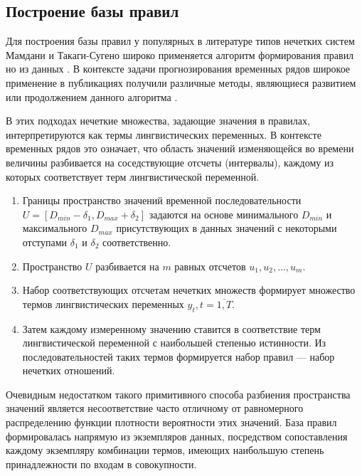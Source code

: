 \subsection{Построение базы правил}

Для построения базы правил у популярных в литературе типов нечетких систем Мамдани и Такаги-Сугено широко применяется алгоритм формирования правил но из данных \cite{Wang1992}. В контексте задачи прогнозирования временных рядов широкое применение в публикациях получили различные методы, являющиеся развитием или продолжением данного алгоритма \cite{Chellai2022}.

В этих подходах нечеткие множества, задающие значения в правилах, интерпретируются как термы лингвистических переменных. В контексте временных рядов это означает, что область значений изменяющейся во времени величины разбивается на соседствующие отсчеты (интервалы), каждому из которых соответствует терм лингвистической переменной.

\begin{enumerate}
	\item Границы пространство значений временной последовательности $U = [D_{min} - \delta_1, D_{max} + \delta_2]$ задаются на основе минимального $D_{min}$ и максимального $D_{max}$ присутствующих в данных значений с некоторыми отступами $\delta_1$ и $\delta_2$ соответственно.
	\item Пространство $U$ разбивается на $m$ равных отсчетов $u_1, u_2, \dots, u_m$.
	\item Набор соответствующих отсчетам нечетких множеств формирует множество термов лингвистических переменных $y_t, t=\overline{1, T}$.
	\item Затем каждому измеренному значению ставится в соответствие терм лингвистической переменной с наибольшей степенью истинности. Из последовательностей таких термов формируется набор правил --- набор нечетких отношений.
\end{enumerate}

Очевидным недостатком такого примитивного способа разбиения пространства значений является несоответствие часто отличному от равномерного распределению функции плотности вероятности этих значений. База правил формировалась напрямую из экземпляров данных, посредством сопоставления каждому экземпляру комбинации термов, имеющих наибольшую степень принадлежности по входам в совокупности.

